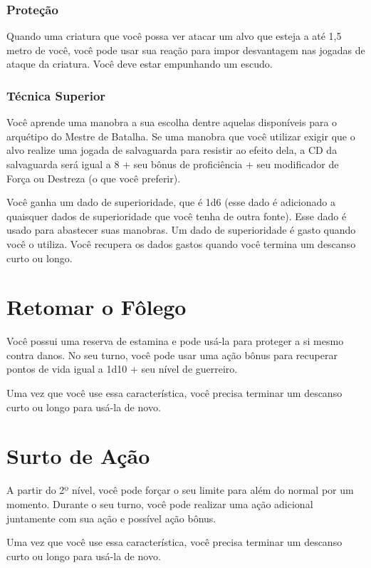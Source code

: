 \documentclass{RPG_Adventure}[2021/10/20]
\begin{document}
\subsubsection{Proteção}%

Quando uma criatura que você possa ver atacar um alvo que esteja a até 1,5 metro
de você, você pode usar sua reação para impor desvantagem nas jogadas de ataque
da criatura. Você deve estar empunhando um escudo.

\subsubsection{Técnica Superior}%

Você aprende uma manobra a sua escolha dentre aquelas disponíveis para o
arquétipo do Mestre de Batalha. Se uma manobra que você utilizar exigir que o
alvo realize uma jogada de salvaguarda para resistir ao efeito dela, a CD da
salvaguarda será igual a 8 + seu bônus de proficiência + seu modificador de
Força ou Destreza (o que você preferir).

Você ganha um dado de superioridade, que é 1d6 (esse dado é adicionado a
quaisquer dados de superioridade que você tenha de outra fonte). Esse dado é
usado para abastecer suas manobras. Um dado de superioridade é gasto quando você
o utiliza. Você recupera os dados gastos quando você termina um descanso curto
ou longo.

\section*{Retomar o Fôlego}%

Você possui uma reserva de estamina e pode usá-la para proteger a si mesmo
contra danos. No seu turno, você pode usar uma ação bônus para recuperar pontos
de vida igual a 1d10 + seu nível de guerreiro.

Uma vez que você use essa característica, você precisa terminar um descanso
curto ou longo para usá-la de novo.

\section*{Surto de Ação}%

A partir do 2º nível, você pode forçar o seu limite para além do normal por um
momento. Durante o seu turno, você pode realizar uma ação adicional juntamente
com sua ação e possível ação bônus.

Uma vez que você use essa característica, você precisa terminar um descanso
curto ou longo para usá-la de novo.
\end{document}
